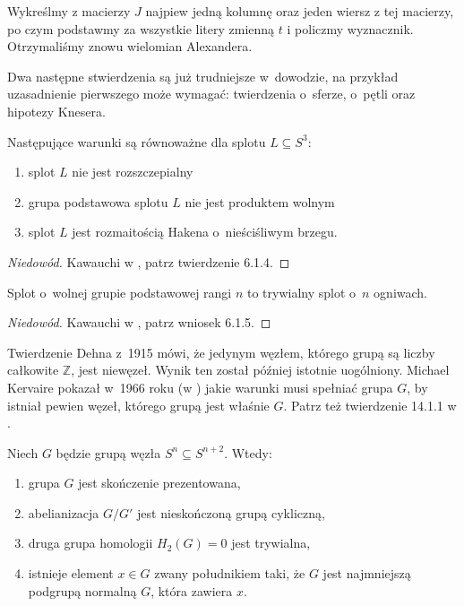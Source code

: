 Wykreślmy z macierzy $J$ najpiew jedną kolumnę oraz jeden wiersz z tej macierzy, po czym podstawmy za wszystkie litery zmienną $t$ i policzmy wyznacznik.
Otrzymaliśmy znowu wielomian Alexandera.

Dwa następne stwierdzenia są już trudniejsze w~dowodzie,
na przykład uzasadnienie pierwszego może wymagać:
twierdzenia o~sferze, o~pętli oraz hipotezy Knesera.

\begin{proposition}
    \label{prop:knot_group_split}
    Następujące warunki są równoważne dla splotu $L \subseteq S^3$:
    \begin{enumerate}
        \item splot $L$ nie jest rozszczepialny
        \item grupa podstawowa splotu $L$ nie jest produktem wolnym
        \item splot $L$ jest rozmaitością Hakena o~nieściśliwym brzegu.
    \end{enumerate}
\end{proposition}

\begin{proof}[Niedowód]
    Kawauchi w \cite{kawauchi96}, patrz twierdzenie 6.1.4.
\end{proof}

\begin{proposition}
    \label{prop:knot_group_free}
    Splot o~wolnej grupie podstawowej rangi $n$ to trywialny splot o~$n$ ogniwach.
\end{proposition}

\begin{proof}[Niedowód]
    Kawauchi w \cite{kawauchi96}, patrz wniosek 6.1.5.
\end{proof}

Twierdzenie Dehna z~1915 mówi, że jedynym węzłem, którego grupą są liczby całkowite $\mathbb Z$, jest niewęzeł.
Wynik ten został później istotnie uogólniony.
Michael Kervaire pokazał w~1966 roku (w \cite{kervaire65}) jakie warunki musi spełniać grupa $G$, by istniał pewien węzeł, którego grupą jest właśnie $G$.
Patrz też twierdzenie 14.1.1 w \cite{kawauchi96}.

\begin{proposition}
    Niech $G$ będzie grupą węzła $S^n \subseteq S^{n+2}$.
    Wtedy:
    \begin{enumerate}[leftmargin=*]
        \itemsep0em
        \item grupa $G$ jest skończenie prezentowana,
        \item abelianizacja $G/G'$ jest nieskończoną grupą cykliczną,
        \item druga grupa homologii $H_2(G) = 0$ jest trywialna,
        \item istnieje element $x \in G$ zwany południkiem taki, że $G$ jest najmniejszą podgrupą normalną $G$, która zawiera $x$.
    \end{enumerate}
\end{proposition}

